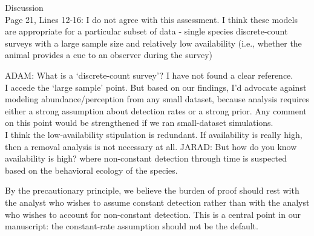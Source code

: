 \documentclass[12pt]{article}
\renewenvironment{quote}  %
              {\list{}{\rightmargin\leftmargin}\normalfont%
               \item\relax}
              {\endlist}
\newcommand{\adam}[1]{{\color{blue} ADAM: #1}}
\newcommand{\jarad}[1]{{\color{Orange} JARAD: #1}}
\begin{document}
Discussion\\
Page 21, Lines 12-16:  I do not agree with this assessment.  I think these models are appropriate for a particular subset of data - single species discrete-count surveys with a large sample size and relatively low availability (i.e., whether the animal provides a cue to an observer during the survey)   
\begin{quote}
\adam{What is a `discrete-count survey'?  I have not found a clear reference.\\
I accede the `large sample' point.  But based on our findings, I'd advocate against modeling abundance/perception from any small dataset, because analysis requires either a strong assumption about detection rates or a strong prior.  Any comment on this point would be strengthened if we ran small-dataset simulations.\\
I think the low-availability stipulation is redundant.  If availability is really high, then a removal analysis is not necessary at all.}
\jarad{But how do you know availability is high?}
\end{quote}
where non-constant detection through time is suspected based on the behavioral ecology of the species.
\begin{quote}
By the precautionary principle, we believe the burden of proof should rest with the analyst who wishes to assume constant detection rather than with the analyst who wishes to account for non-constant detection.
This is a central point in our manuscript: the constant-rate assumption should not be the default.
\end{quote}
\end{document}
